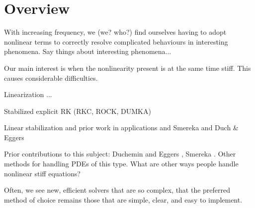 \section{Overview}

With increasing frequency, we (we? who?) find ourselves having to adopt nonlinear terms to correctly resolve complicated behaviours in interesting phenomena. Say things about interesting phenomena...

Our main interest is when the nonlinearity present is at the same time stiff. This causes considerable difficulties. 

Linearization ...

Stabilized explicit RK (RKC, ROCK, DUMKA)

Linear stabilization and prior work in applications and Smereka and Duch \& Eggers

Prior contributions to this subject: Duchemin and Eggers \cite{duchemin2014explicit}, Smereka \cite{smereka2003semi}. Other methods for handling PDEs of this type.
What are other ways people handle nonlinear stiff equations? 

Often, we see new, efficient solvers that are so complex, that the preferred method of choice remains those that are simple, clear, and easy to implement. 
